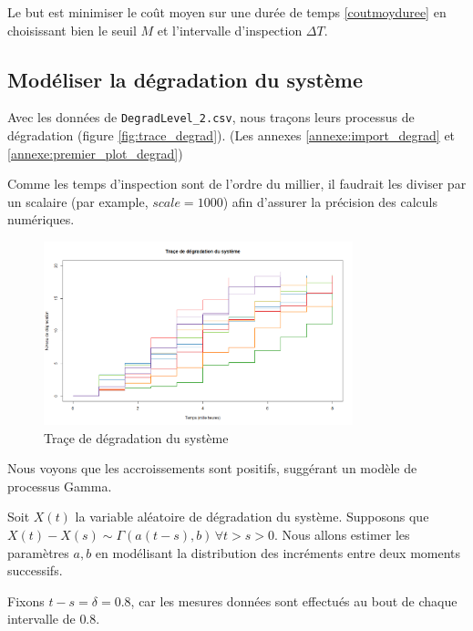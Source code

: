 \documentclass[10pt,a4paper]{article}
\begin{document}
Le but est minimiser le coût moyen sur une durée de temps \eqref{coutmoyduree} en choisissant bien le seuil $M$ et l'intervalle d'inspection $\Delta T$.
\subsection{Modéliser la dégradation du système}

Avec les données de \texttt{DegradLevel\_2.csv}, nous traçons leurs processus de dégradation (figure \eqref{fig:trace_degrad}). (Les annexes \eqref{annexe:import_degrad} et \eqref{annexe:premier_plot_degrad})

Comme les temps d'inspection sont de l'ordre du millier, il faudrait les diviser par un scalaire (par example, $scale = 1000$) afin d'assurer la précision des calculs numériques.

\begin{figure}[!h]
    \centering
    \includegraphics[width=0.8\textwidth]{img/trace_degrad.png}
    \caption{Traçe de dégradation du système}
    \label{fig:trace_degrad}
\end{figure}

Nous voyons que les accroissements sont positifs, suggérant un modèle de processus Gamma.

Soit $X(t)$ la variable aléatoire de dégradation du système. Supposons que $X(t) - X(s) \sim \Gamma(a(t-s),b)\,\forall t > s > 0$. Nous allons estimer les paramètres $a,b$ en modélisant la distribution des incréments entre deux moments successifs.

Fixons $t-s = \delta = 0.8$, car les mesures données sont effectués au bout de chaque intervalle de $0.8$.
\end{document}

